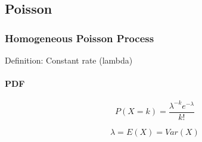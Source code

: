 \documentclass[../doc.tex]{subfiles}
\begin{document}
\subsection{Poisson}

\subsubsection{Homogeneous Poisson Process} 

Definition: Constant rate (lambda)

\paragraph{PDF}
\[
P(X = k) = \frac{\lambda^{-k} e^{-\lambda}}{k!}
\]

\[
\lambda = E(X) = Var(X)
\]
\end{document}
